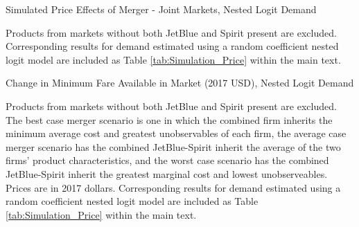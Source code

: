 \documentclass{article}
\begin{document}
\begin{appendices}
      \begin{table}
        \caption{Simulated Price Effects of Merger - Joint Markets, Nested Logit Demand}
        \label{tab:Simulation_Price_NestedLogit}
                \vspace{-15mm}
        \begin{center}
         
        \end{center}
        \vspace{-5mm}
        \footnotesize{Products from markets without both JetBlue and Spirit present are excluded. Corresponding results for demand estimated using a random coefficient nested logit model are included as Table \ref{tab:Simulation_Price} within the main text.}

     \end{table}

 \begin{table}
        \caption{Change in Minimum Fare Available in Market (2017 USD), Nested Logit Demand}
        \label{tab:MinimumPrice_NestedLogit}
                \vspace{-15mm}
        \begin{center}
            
        \end{center}
        \vspace{-5mm}
        \footnotesize{Products from markets without both JetBlue and Spirit present are excluded. The best case merger scenario is one in which the combined firm inherits the minimum average cost and greatest unobservables of each firm, the average case merger scenario has the combined JetBlue-Spirit inherit the average of the two firms' product characteristics, and the worst case scenario has the combined JetBlue-Spirit inherit the greatest marginal cost and lowest unobserveables. Prices are in 2017 dollars. Corresponding results for demand estimated using a random coefficient nested logit model are included as Table \ref{tab:Simulation_Price} within the main text.}
    \end{table}    


    
\end{appendices}
	
\end{document}
